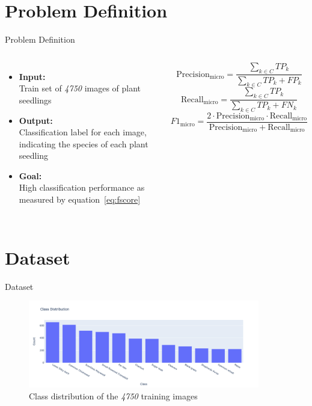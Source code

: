 \documentclass{beamer}
\begin{document}
\section{Problem Definition}
\begin{frame}{Problem Definition}
    \begin{columns}
        \begin{itemize}
            \item \textbf{Input:\\}Train set of \textit{4750} images of plant seedlings
            \item \textbf{Output:\\}Classification label for each image, indicating the species of each plant seedling
            \item \textbf{Goal:\\}High classification performance as measured by equation~\ref{eq:fscore}
        \end{itemize}
        \begin{equation}
            \text{Precision}_{\text{micro}} = \frac{\sum_{k \in C} \mathit{TP_k}}{\sum_{k \in C} \mathit{TP_k} + \mathit{FP_k}}\label{eq:precision}
        \end{equation}
        \begin{equation}
            \text{Recall}_{\text{micro}} = \frac{\sum_{k \in C} \mathit{TP_k}}{\sum_{k \in C} \mathit{TP_k} + \mathit{FN_k}}\label{eq:recall}
        \end{equation}
        \begin{equation}
            F1_{\text{micro}} = \frac{2 \cdot \text{Precision}_{\text{micro}} \cdot \text{Recall}_{\text{micro}}}{\text{Precision}_{\text{micro}} + \text{Recall}_{\text{micro}}}\label{eq:fscore}
        \end{equation}
    \end{columns}
\end{frame}

\section{Dataset}
\begin{frame}{Dataset}
    \begin{figure}
        \centering
        \includegraphics[width=0.9\textwidth]{../resources/class_distribution.png}
        \caption{Class distribution of the \textit{4750} training images}\label{fig:class-distribution}
    \end{figure}
\end{frame}
\end{document}
